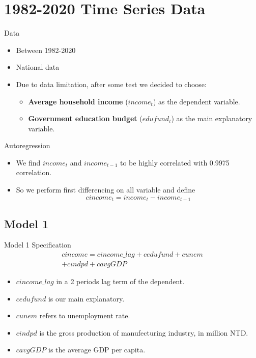 \documentclass[compress]{beamer}
\begin{document}
\section[Time Series]{1982-2020 Time Series Data}
\begin{frame}{Data}
  \begin{itemize}
    \item Between 1982-2020
    \item National data
    \item Due to data limitation, after some test we decided to choose:
    \begin{itemize}
      \item \textbf{Average household income} ($income_t$) as the dependent variable.
      \item \textbf{Government education budget} ($edufund_t$) as the main explanatory variable.
    \end{itemize}
  \end{itemize}
\end{frame}

\begin{frame}{Autoregression}
  \begin{itemize}
    \item We find $income_t$ and $income_{t-1}$ to be highly correlated with 0.9975 correlation.
    \item So we perform first differencing on all variable and define
    \begin{equation}
      cincome_t = income_t - income_{t-1}
    \end{equation}
  \end{itemize}
\end{frame}

\subsection{Model 1}

\begin{frame}{Model 1 Specification}
  \begin{multline}
    cincome = cincome\_lag + cedufund + cunem \\ + cindpd + cavgGDP
  \end{multline}
  \begin{itemize}
    \item $cincome\_lag$ in a 2 periods lag term of the dependent.
    \item $cedufund$ is our main explanatory.
    \item $cunem$ refers to unemployment rate.
    \item $cindpd$ is the gross production of manufecturing industry, in million NTD.
    \item $cavgGDP$ is the average GDP per capita.
  \end{itemize}
\end{frame}
\end{document}
